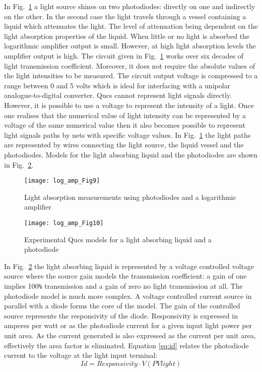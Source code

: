 In Fig.~\ref{fig:log_amp9} a light source shines on two photodiodes:
directly on one and indirectly on the other. In the second case the
light travels through a vessel containing a liquid which attenuates
the light. The level of attenuation being dependent on the light
absorption properties of the liquid.  When little or no light is
absorbed the logarithmic amplifier output is small. However, at high
light absorption levels the amplifier output is high. The circuit
given in Fig.~\ref{fig:log_amp9} works over six decades of light
transmission coefficient. Moreover, it does not require the absolute
values of the light intensities to be measured. The circuit output
voltage is compressed to a range between 0 and 5 volts which is ideal
for interfacing with a unipolar analogue-to-digital converter. Qucs
cannot represent light signals directly. However, it is possible to
use a voltage to represent the intensity of a light. Once one realises
that the numerical value of light intensity can be represented by a
voltage of the same numerical value then it also becomes possible to
represent light signals paths by nets with specific voltage values.
In Fig.~\ref{fig:log_amp9} the light paths are represented by wires
connecting the light source, the liquid vessel and the
photodiodes. Models for the light absorbing liquid and the photodiodes
are shown in Fig.~\ref{fig:log_amp10}.


 \begin{figure} [here]
  \centering
  \texttt{[image: log\_amp\_Fig9]}
  \caption{Light absorption measurements using photodiodes and a logarithmic amplifier}
  \label{fig:log_amp9}
\end{figure}   


 \begin{figure} [here]
  \centering
  \texttt{[image: log\_amp\_Fig10]}
  \caption{Experimental Qucs models for a light absorbing liquid and a photodiode}
  \label{fig:log_amp10}
\end{figure}

In Fig.~\ref{fig:log_amp10} the light absorbing liquid is represented
by a voltage controlled voltage source where the source gain models
the transmission coefficient: a gain of one implies 100\verb|%|
transmission and a gain of zero no light transmission at all. The
photodiode model is much more complex.  A voltage controlled current
source in parallel with a diode forms the core of the model.  The gain
of the controlled source represents the responsivity of the
diode. Responsivity is expressed in amperes per watt or as the
photodiode current for a given input light power per unit area. As the
current generated is also expressed as the current per unit area,
effectively the area factor is eliminated.  Equation \eqref{eq:id}
relates the photodiode current to the voltage at the light input
terminal:
\begin{equation}
\label{eq:id}
Id=Responsivity\cdot V(PVlight)
\end{equation}

